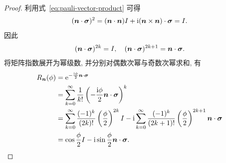 \documentclass[a4paper]{ctexart}
\begin{document}
\begin{proof}
    利用式~\eqref{eq:pauli-vector-product} 可得
    \begin{align}
        (\bm{n}\cdot\bm{\sigma})^2=(\bm{n}\cdot\bm{n})I+\mathrm{i}(\bm{n}\times\bm{n})\cdot\bm{\sigma}=I.
    \end{align}
    因此
    \begin{align}
        (\bm{n}\cdot\bm{\sigma})^{2k}=I, \quad (\bm{n}\cdot\bm{\sigma})^{2k+1}=\bm{n}\cdot\bm{\sigma}.
    \end{align}
    将矩阵指数展开为幂级数, 并分别对偶数次幂与奇数次幂求和, 有
    \begin{align}
        R_{\bm{n}}(\phi) & =\mathrm{e}^{-\frac{\mathrm{i}\phi}{2}\bm{n}\cdot\bm{\sigma}}                                                                                                                                 \\
                         & =\sum_{k=0}^{\infty}\frac{1}{k!}\left(-\frac{\mathrm{i}\phi}{2}\bm{n}\cdot\bm{\sigma}\right)^k                                                                                        \\
                         & =\sum_{k=0}^{\infty}\frac{(-1)^k}{(2k)!}\left(\frac{\phi}{2}\right)^{2k}I-\mathrm{i}\sum_{k=0}^{\infty}\frac{(-1)^k}{(2k+1)!}\left(\frac{\phi}{2}\right)^{2k+1}\bm{n}\cdot\bm{\sigma} \\
                         & =\cos\frac{\phi}{2}I-\mathrm{i}\sin\frac{\phi}{2}\bm{n}\cdot\bm{\sigma}.
    \end{align}


\end{proof}
\end{document}
